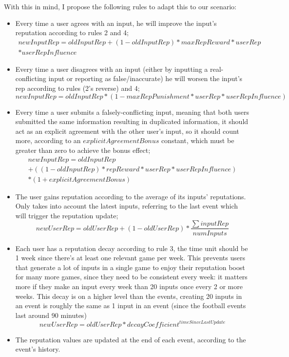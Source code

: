 With this in mind, I propose the following rules to adapt this to our scenario:

\begin{itemize}
    \item Every time a user agrees with an input, he will improve the input's reputation according to rules 2 and 4;
    \begin{multline}
        newInputRep = oldInputRep + (1 - oldInputRep) * maxRepReward * userRep\\ * userRepInfluence
    \end{multline}
    \item Every time a user disagrees with an input (either by inputting a real-conflicting input or reporting as false/inaccurate) he will worsen the input's rep according to rules (2's reverse) and 4;
    \begin{equation}
        newInputRep = oldInputRep * (1 - maxRepPunishment * userRep * userRepInfluence)
    \end{equation}
    \item Every time a user submits a falsely-conflicting input, meaning that both users submitted the same information resulting in duplicated information, it should act as an explicit agreement with the other user's input, so it should count more, according to an $explicitAgreementBonus$ constant, which must be greater than zero to achieve the bonus effect;
    \begin{multline}
    newInputRep = oldInputRep \\+ ((1 - oldInputRep) * repReward * userRep * userRepInfluence)\\ * (1 + explicitAgreementBonus)
    \end{multline}
    \item The user gains reputation according to the average of its inputs' reputations. Only takes into account the latest inputs, referring to the last event which will trigger the reputation update;
    \begin{equation}
        newUserRep = oldUserRep + (1 - oldUserRep) * \frac{\sum inputRep}{numInputs}
    \end{equation}
    \item Each user has a reputation decay according to rule 3, the time unit should be 1 week since there's at least one relevant game per week. This prevents users that generate a lot of inputs in a single game to enjoy their reputation boost for many more games, since they need to be consistent every week: it matters more if they make an input every week than 20 inputs once every 2 or more weeks.
    This decay is on a higher level than the events, creating 20 inputs in an event is roughly the same as 1 input in an event (since the football events last around 90 minutes)
    \begin{equation}
        newUserRep = oldUserRep * decayCoefficient^{timeSinceLastUpdate}
    \end{equation}
    \item The reputation values are updated at the end of each event, according to the event's history.
\end{itemize}

